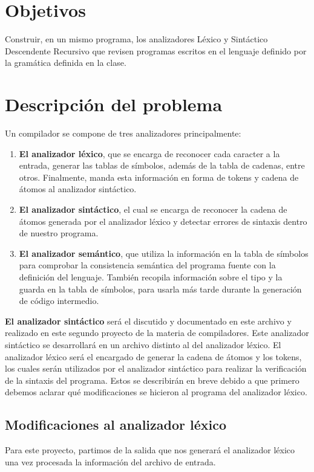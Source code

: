 \documentclass[12pt, a4paper]{article}
\begin{document}
\newpage

\section{Objetivos}

Construir, en un mismo programa, los analizadores Léxico y Sintáctico Descendente Recursivo que revisen programas escritos en el lenguaje definido por la gramática definida en la clase.

\section{Descripción del problema}

Un compilador se compone de tres analizadores principalmente: 

\begin{enumerate}
  \item \textbf{El analizador léxico}, que se encarga de reconocer cada caracter a la entrada, generar las tablas de símbolos, además de la tabla de cadenas, entre otros. Finalmente, manda esta información en forma de tokens y cadena de átomos al analizador sintáctico.
  \item \textbf{El analizador sintáctico}, el cual se encarga de reconocer la cadena de átomos generada por el analizador léxico y detectar errores de sintaxis dentro de nuestro programa.
  \item \textbf{El analizador semántico}, que utiliza la información en la tabla de símbolos para comprobar la consistencia semántica del programa fuente con la definición del lenguaje. También recopila información sobre el tipo y la guarda en la tabla de símbolos, para usarla más tarde durante la generación de código intermedio.
\end{enumerate}

\textbf{El analizador sintáctico} será el discutido y documentado en este archivo y realizado en este segundo proyecto de la materia de compiladores. Este analizador sintáctico se desarrollará en un archivo distinto al del analizador léxico. El analizador léxico será el encargado de generar la cadena de átomos y los tokens, los cuales serán utilizados por el analizador sintáctico para realizar la verificación de la sintaxis del programa. Estos se describirán en breve debido a que primero debemos aclarar qué modificaciones se hicieron al programa del analizador léxico.

\subsection{Modificaciones al analizador léxico}
Para este proyecto, partimos de la salida que nos generará el analizador léxico una vez procesada la información del archivo de entrada.
\end{document}
